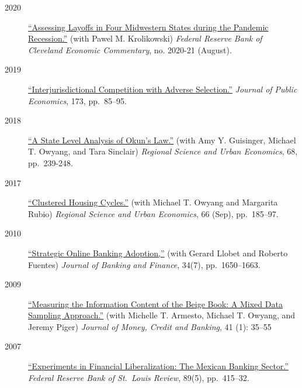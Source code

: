 \documentclass[10pt,]{article}
\def\tightlist{}
\begin{document}
\begin{description}
\tightlist
\item[2020]
\href{https://dx.doi.org/10.26509/frbc-ec-202021}{``Assessing Layoffs in
Four Midwestern States during the Pandemic Recession.''} (with Pawel M.
Krolikowski) \emph{Federal Reserve Bank of Cleveland Economic
Commentary}, no. 2020-21 (August).
\item[2019]
\href{https://dx.doi.org/10.1016/j.jpubeco.2019.01.012}{``Interjurisdictional
Competition with Adverse Selection.''} \emph{Journal of Public
Economics}, 173, pp.~85--95.
\item[2018]
\href{https://dx.doi.org/10.1016/j.regsciurbeco.2017.11.005}{``A State
Level Analysis of Okun's Law.''} (with Amy Y. Guisinger, Michael T.
Owyang, and Tara Sinclair) \emph{Regional Science and Urban Economics},
68, pp.~239-248.
\item[2017]
\href{https://dx.doi.org/10.1016/j.regsciurbeco.2017.06.003}{``Clustered
Housing Cycles.''} (with Michael T. Owyang and Margarita Rubio)
\emph{Regional Science and Urban Economics}, 66 (Sep), pp.~185--97.
\item[2010]
\href{http://dx.doi.org/10.1016/j.jbankfin.2010.03.011}{``Strategic
Online Banking Adoption,''} (with Gerard Llobet and Roberto Fuentes)
\emph{Journal of Banking and Finance}, 34(7), pp.~1650--1663.
\item[2009]
\href{https://dx.doi.org/10.1111/j.1538-4616.2008.00186.x}{``Measuring
the Information Content of the Beige Book: A Mixed Data Sampling
Approach.''} (with Michelle T. Armesto, Michael T. Owyang, and Jeremy
Piger) \emph{Journal of Money, Credit and Banking}, 41 (1): 35--55
\item[2007]
\href{http://research.stlouisfed.org/publications/review/07/09/HernandezMurillo.pdf}{``Experiments
in Financial Liberalization: The Mexican Banking Sector.''}
\emph{Federal Reserve Bank of St.~Louis Review}, 89(5), pp.~415--32.
\end{description}
\end{document}
